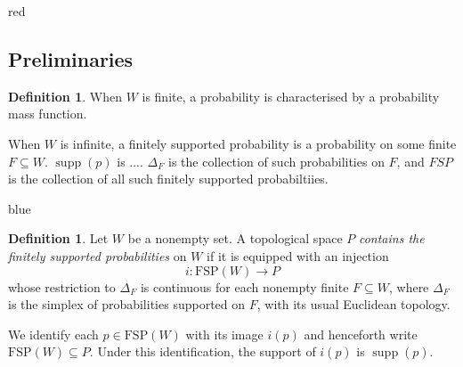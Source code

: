 \documentclass[11pt]{article}
\theoremstyle{definition}
\newtheorem{definition}[theorem]{Definition}
\theoremstyle{remark}
\newcommand{\supp}{\operatorname{supp}}
\newcommand{\FSP}{\mathrm{FSP}}
\newenvironment{AIwritten}{\begin{color}{blue}}{\end{color}}
\begin{document}
\begin{center}
\end{center}



\begin{color}{red}
\subsection{Preliminaries}
\newcommand{\Probs}{P}
\begin{definition}
	When $W$ is finite, a probability is characterised by a probability mass function. 
	
	When $W$ is infinite, a finitely supported probability is a probability on some finite $F\subseteq W$.  $\supp(p)$ is .... $\Delta_F$ is the collection of such probabilities on $F$, and $FSP$ is the collection of all such finitely supported probabiltiies. 
\end{definition}
\begin{AIwritten}
	\begin{definition}
		Let $W$ be a nonempty set. 
		A topological space $\Probs$
		\emph{contains the finitely supported probabilities} on $W$ if it
		is equipped with an injection
		\[
		i:\mathrm{FSP}(W)\longrightarrow\Probs
		\]
		whose restriction to $\Delta_F$ is continuous for each
		nonempty finite $F\subseteq W$, where $\Delta_F$ is the
		simplex of probabilities supported on $F$, with its usual
		Euclidean topology.
		
		We identify each $p\in\mathrm{FSP}(W)$ with its image $i(p)$
		and henceforth write $\mathrm{FSP}(W)\subseteq\Probs$.
		Under this identification, the support of $i(p)$ is
		$\operatorname{supp}(p)$.
	\end{definition}
\end{AIwritten}

\end{color}
\end{document}
